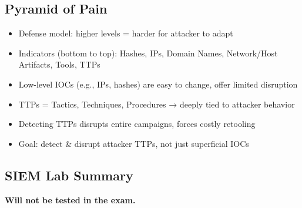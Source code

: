 \subsection{Pyramid of Pain}
{
\begin{itemize}[noitemsep]
  \item Defense model: higher levels = harder for attacker to adapt
  \item Indicators (bottom to top): Hashes, IPs, Domain Names, Network/Host Artifacts, Tools, TTPs
  \item Low-level IOCs (e.g., IPs, hashes) are easy to change, offer limited disruption
  \item TTPs = Tactics, Techniques, Procedures → deeply tied to attacker behavior
  \item Detecting TTPs disrupts entire campaigns, forces costly retooling
  \item Goal: detect \& disrupt attacker TTPs, not just superficial IOCs
\end{itemize}
}

\subsection{SIEM Lab Summary}
{
\textbf{Will not be tested in the exam.}
}

